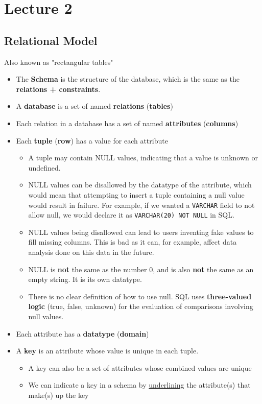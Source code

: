\documentclass{article}
\begin{document}
\section*{Lecture 2}
\subsection*{Relational Model}
Also known as "rectangular tables"
\begin{itemize}
    \item The \textbf{Schema} is the structure of the database, which is the same as the \textbf{relations + constraints}.
    \item A \textbf{database} is a set of named \textbf{relations} (\textbf{tables})
    \item Each relation in a database has a set of named \textbf{attributes} (\textbf{columns})
    \item Each \textbf{tuple} (\textbf{row}) has a value for each attribute
    \begin{itemize}
        \item A tuple may contain NULL values, indicating that a value is unknown or undefined.
        \item NULL values can be disallowed by the datatype of the attribute, which would mean that attempting to insert a tuple containing a null value would result in failure. For example, if we wanted a \verb|VARCHAR| field to not allow null, we would declare it as \verb|VARCHAR(20) NOT NULL| in SQL.
        \item NULL values being disallowed can lead to users inventing fake values to fill missing columns. This is bad as it can, for example, affect data analysis done on this data in the future.
        \item NULL is \textbf{not} the same as the number 0, and is also \textbf{not} the same as an empty string. It is its own datatype.
        \item There is no clear definition of how to use null. SQL uses \textbf{three-valued logic} (true, false, unknown) for the evaluation of comparisons involving null values.
    \end{itemize}
    \item Each attribute has a \textbf{datatype} (\textbf{domain})
    \item A \textbf{key} is an attribute whose value is unique in each tuple.
    \begin{itemize}
        \item A key can also be a set of attributes whose combined values are unique
        \item We can indicate a key in a schema by \underline{underlining} the attribute(s) that make(s) up the key
    \end{itemize}
\end{itemize}
\end{document}
